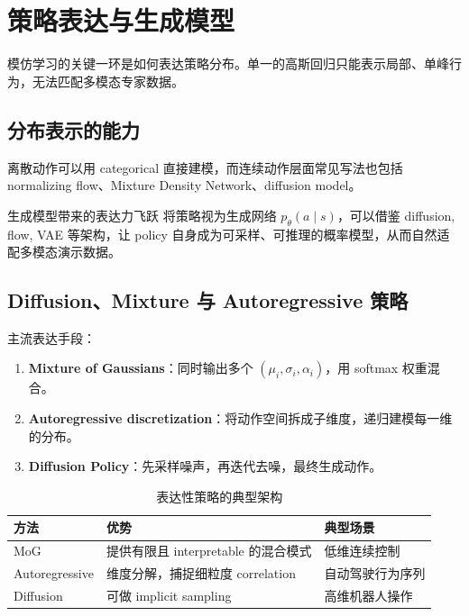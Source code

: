 \section{策略表达与生成模型}

模仿学习的关键一环是如何表达策略分布。单一的高斯回归只能表示局部、单峰行为，无法匹配多模态专家数据。

\subsection{分布表示的能力}

离散动作可以用 categorical 直接建模，而连续动作层面常见写法也包括 normalizing flow、Mixture Density Network、diffusion model。

\begin{importantbox}{生成模型带来的表达力飞跃}
将策略视为生成网络 $p_\theta(a \mid s)$，可以借鉴 diffusion, flow, VAE 等架构，让 policy 自身成为可采样、可推理的概率模型，从而自然适配多模态演示数据。
\end{importantbox}

\subsection{Diffusion、Mixture 与 Autoregressive 策略}

主流表达手段：
\begin{enumerate}
    \item \textbf{Mixture of Gaussians}：同时输出多个 $(\mu_i, \sigma_i, \alpha_i)$，用 softmax 权重混合。
    \item \textbf{Autoregressive discretization}：将动作空间拆成子维度，递归建模每一维的分布。
    \item \textbf{Diffusion Policy}：先采样噪声，再迭代去噪，最终生成动作。
\end{enumerate}

\begin{table}[H]
\centering
\begin{tabular}{p{} p{} p{}}
\toprule
方法 & 优势 & 典型场景 \\
\midrule
MoG & 提供有限且 interpretable 的混合模式 & 低维连续控制 \\
Autoregressive & 维度分解，捕捉细粒度 correlation & 自动驾驶行为序列 \\
Diffusion & 可做 implicit sampling & 高维机器人操作 \\
\bottomrule
\end{tabular}
\caption{表达性策略的典型架构}
\end{table}

